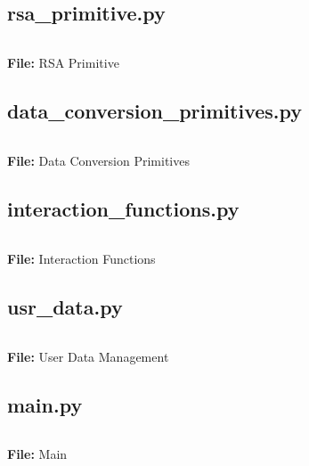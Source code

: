 \documentclass{article}
\newenvironment{longlisting}{\captionsetup{type=listing}}{}
\begin{document}
\subsection{rsa\_primitive.py}
\begin{longlisting}
\inputminted{python}{../src/rsa_primitive.py}
\caption{\textbf{File:} RSA Primitive}
\end{longlisting}


\subsection{data\_conversion\_primitives.py}
\begin{longlisting}
\inputminted{python}{../src/data_conversion_primitives.py}
\caption{\textbf{File:} Data Conversion Primitives}
\end{longlisting}


\subsection{interaction\_functions.py}
\begin{longlisting}
\inputminted{python}{../src/interaction_functions.py}
\caption{\textbf{File:} Interaction Functions}
\end{longlisting}


\subsection{usr\_data.py}
\begin{longlisting}
\inputminted{python}{../src/usr_data.py}
\caption{\textbf{File:} User Data Management}
\end{longlisting}


\subsection{main.py}
\begin{longlisting}
\inputminted{python}{../src/main.py}
\caption{\textbf{File:} Main}
\end{longlisting}


\newpage

\printbibliography
{}
\end{document}
